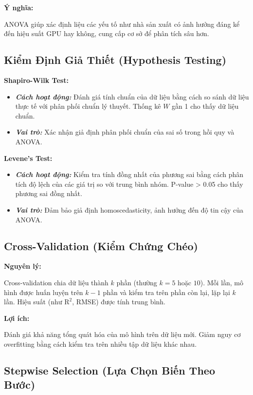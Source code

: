 \textbf{Ý nghĩa:}

ANOVA giúp xác định liệu các yếu tố như nhà sản xuất có ảnh hưởng đáng kể đến hiệu suất GPU hay không, cung cấp cơ sở để phân tích sâu hơn.


\subsection{Kiểm Định Giả Thiết (Hypothesis Testing)}

\textbf{Shapiro-Wilk Test:}

\begin{itemize}
    \item \textbf{\textit{Cách hoạt động:}} Đánh giá tính chuẩn của dữ liệu bằng cách so sánh dữ liệu thực tế với phân phối chuẩn lý thuyết. Thống kê $W$ gần 1 cho thấy dữ liệu chuẩn.
    \item \textbf{\textit{Vai trò:}} Xác nhận giả định phân phối chuẩn của sai số trong hồi quy và ANOVA.
\end{itemize}


\textbf{Levene’s Test:}

\begin{itemize}
    \item \textbf{\textit{Cách hoạt động:}} Kiểm tra tính đồng nhất của phương sai bằng cách phân tích độ lệch của các giá trị so với trung bình nhóm. P-value > 0.05 cho thấy phương sai đồng nhất.
    \item \textbf{\textit{Vai trò:}} Đảm bảo giả định homoscedasticity, ảnh hưởng đến độ tin cậy của ANOVA.
\end{itemize}



\subsection{Cross-Validation (Kiểm Chứng Chéo)}

\textbf{Nguyên lý:}

Cross-validation chia dữ liệu thành $k$ phần (thường $k = 5$ hoặc $10$). Mỗi lần, mô hình được huấn luyện trên $k-1$ phần và kiểm tra trên phần còn lại, lặp lại $k$ lần. Hiệu suất (như $\text{R}^{\text{2}}$, RMSE) được tính trung bình.

\textbf{Lợi ích:}

Đánh giá khả năng tổng quát hóa của mô hình trên dữ liệu mới.
Giảm nguy cơ overfitting bằng cách kiểm tra trên nhiều tập dữ liệu khác nhau.



\subsection{Stepwise Selection (Lựa Chọn Biến Theo Bước)}


